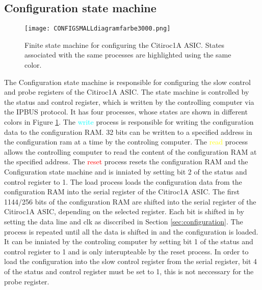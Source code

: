\subsection{Configuration state machine}
\begin{figure}[H]
    \centering
    \texttt{[image: CONFIGSMALLdiagramfarbe3000.png]}%
    \caption{Finite state machine for configuring the Citiroc1A ASIC.
    States associated with the same processes are highlighted using the same color.}
    \label{fig:Configuration_state_machine}
\end{figure}
The Configuration state machine is responsible for configuring the slow control and probe registers of the Citiroc1A ASIC.
The state machine is controlled by the status and control register, which is written by the controlling computer via the IPBUS protocol.
It has four processes, whose states are shown in different colors in Figure \ref{fig:Configuration_state_machine}.
\newline
The \textcolor{cyan}{write} process is responsible for writing the configuration data to the configuration RAM.
32 bits can be written to a specified address in the configuration ram at a time by the controling computer.
\newline
The \textcolor{yellow}{read} process allows the controlling computer to read the content of the configuration RAM at the specified address.
\newline
The \textcolor{red}{reset} process resets the configuration RAM and the Configuration state machine and is inniated by setting bit 2 of the status and control register to 1.
\newline
The \textcolor{VioletRed}{load} process loads the configuration data from the configuration RAM into the serial register of the Citiroc1A ASIC. 
The first 1144/256 bits of the configuration RAM are shifted into the serial register of the Citiroc1A ASIC, depending on the selected register.
Each bit is shifted in by setting the data line and clk as disccribed in Section \ref{sec:configuration}. 
\newline
The process is repeated until all the data is shifted in and the configuration is loaded.
It can be inniated by the controling computer by setting bit 1 of the status and control register to 1 and is only interupteable by the reset process.
\newline
In order to load the configuration into the slow control register from the serial register, bit 4 of the status and control register must be set to 1, this is not neccessary for the probe register.

